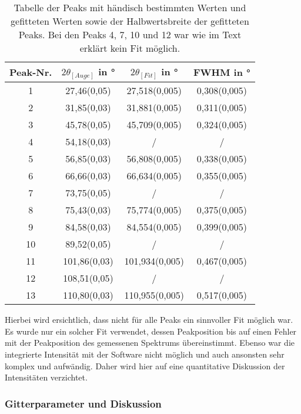 \begin{table}[h!]
    \centering
     \begin{tabular}{|c|c|c|c|} 
     \hline
     Peak-Nr. & $2\theta_{[Auge]}$ in ° & $2\theta_{[Fit]}$ in ° & FWHM in ° \\ [0.5ex] 
     \hline\hline
     1 & \num{27,46(0,05)} & \num{27,518(0,005)} & \num{0,308(0,005)} \\ 
     2 & \num{31,85(0,03)} & \num{31,881(0,005)} & \num{0,311(0,005)} \\
     3 & \num{45,78(0,05)} & \num{45,709(0,005)} & \num{0,324(0,005)} \\
     4 & \num{54,18(0,03)} & / & / \\
     5 & \num{56,85(0,03)} & \num{56,808(0,005)} & \num{0,338(0,005)} \\ 
     6 & \num{66,66(0,03)} & \num{66,634(0,005)} & \num{0,355(0,005)} \\
     7 & \num{73,75(0,05)} & / & / \\
     8 & \num{75,43(0,03)} & \num{75,774(0,005)} & \num{0,375(0,005)} \\
     9 & \num{84,58(0,03)} & \num{84,554(0,005)} & \num{0,399(0,005)} \\
     10 & \num{89,52(0,05)} & / & / \\
     11 & \num{101,86(0,03)} & \num{101,934(0,005)} & \num{0,467(0,005)} \\
     12 & \num{108,51(0,05)} & / & / \\
     13 & \num{110,80(0,03)} & \num{110,955(0,005)} & \num{0,517(0,005)} \\  [1ex] 
     \hline
     \end{tabular}
     \caption[short]{Tabelle der Peaks mit händisch bestimmten Werten und gefitteten Werten sowie der Halbwertsbreite der gefitteten Peaks. Bei den Peaks 4, 7, 10 und 12 war wie im Text erklärt kein Fit möglich.}
     \label{tab:peaks}
\end{table}

Hierbei wird ersichtlich, dass nicht für alle Peaks ein sinnvoller Fit möglich war. Es wurde nur ein solcher Fit verwendet, dessen Peakposition bis auf einen Fehler mit der Peakposition des gemessenen Spektrums übereinstimmt. Ebenso war die integrierte Intensität mit der Software nicht möglich und auch ansonsten sehr komplex und aufwändig. Daher wird hier auf eine quantitative Diskussion der Intensitäten verzichtet.

\subsubsection{Gitterparameter und Diskussion}

